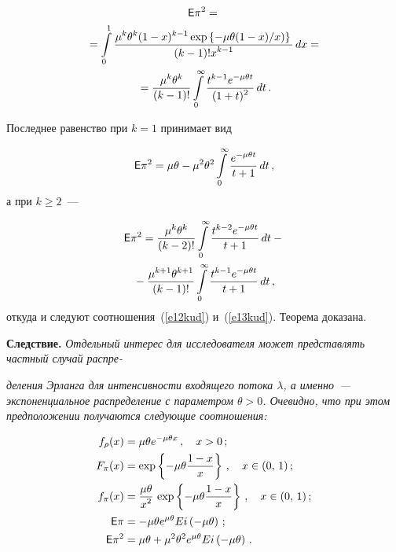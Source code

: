 \begin{multicols}{2}
\vspace*{-14pt}

\noindent
\begin{multline*}
{\sf E}\pi^2={}\\
{}=\int\limits_{0}^{1}\displaystyle\frac{\displaystyle \mu^k\theta^k(1-x)^{k-1}\exp\left\{-\mu\theta (1-x)/x)\right\}\mathstrut}{\displaystyle (k-1)!x^{k-1}\mathstrut}\,dx={}\\
{}=\displaystyle\frac{\displaystyle \mu^k\theta^k\mathstrut}{\displaystyle (k-1)!\mathstrut}\int\limits_{0}^{\infty}\displaystyle\frac{\displaystyle t^{k-1}e^{-\mu\theta
t}\mathstrut}{\displaystyle (1+t)^2\mathstrut}\,dt\,.
\end{multline*}

\noindent
Последнее равенство при $k=1$ принимает вид

\vspace*{1pt}

\noindent
$$
{\sf E}\pi^2=\mu\theta-\mu^2\theta^2\int\limits_{0}^{\infty}\displaystyle\frac{\displaystyle e^{-\mu\theta t}\mathstrut}{\displaystyle t+1\mathstrut}\,dt\,,
$$
а при $k\ge2$~---

\vspace*{-6pt}

\noindent
\begin{multline*}
{\sf E}\pi^2=\displaystyle\frac{\displaystyle \mu^k\theta^k\mathstrut}{\displaystyle (k-2)!\mathstrut}\int\limits_{0}^{\infty}\displaystyle\frac{\displaystyle t^{k-2}e^{-\mu\theta
t}\mathstrut}{\displaystyle t+1\mathstrut}\,dt-{}\\
{}-\displaystyle\frac{\displaystyle \mu^{k+1}\theta^{k+1}\mathstrut}{\displaystyle (k-1)!\mathstrut}\int\limits_{0}^{\infty}\displaystyle\frac{\displaystyle t^{k-1}e^{-\mu\theta t}\mathstrut}{\displaystyle t+1\mathstrut}\,dt\,,
\end{multline*}
откуда и следуют соотношения~(\ref{e12kud}) и~(\ref{e13kud}). Теорема доказана.

\smallskip

\noindent
\textbf{Следствие.} \textit{Отдельный интерес для исследователя может представлять частный случай распре-}\linebreak\vspace*{-12pt}
\columnbreak

\noindent
 \textit{деления
Эрланга для интенсивности входящего потока $\lambda$,
 а именно~--- экспоненциальное распределение с па\-ра\-мет\-ром $\theta>0$.
Очевидно, что при этом предположении получаются следующие соотношения:}

\vspace*{-8pt}

\noindent
\begin{align*}
f_\rho(x)&=\mu\theta e^{-\mu\theta x}\,,\quad x>0\,;\\
F_\pi(x)&=\exp\left\{-\mu\theta\displaystyle\frac{\displaystyle 1-x\mathstrut}{\displaystyle x\mathstrut}\right\}\,,\quad x\in(0,\,1)\,;\\
f_\pi(x)&=\displaystyle\frac{\displaystyle \mu\theta\mathstrut}{\displaystyle x^2\mathstrut}\, \exp\left\{-\mu\theta\displaystyle\frac{\displaystyle 1-x\mathstrut}{\displaystyle x\mathstrut}\right\}\,,\quad x\in(0,\,1)\,;\\
{\sf E}\pi&=-\mu\theta e^{\mu\theta}Ei\left(-\mu\theta\right)\,;\\
{\sf E}\pi^2&=\mu\theta+\mu^2\theta^2e^{\mu\theta}Ei\left(-\mu\theta\right)\,.
\end{align*}


\end{multicols}
